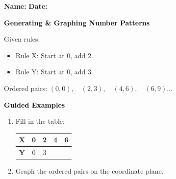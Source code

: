 \documentclass[12pt, letterpaper, fleqn]{article}
\newcommand{\blank}{\underline{\hspace{2.2cm}}}
\begin{document}
\textbf{Name:} \underline{\hspace{5cm}}
\hfill
\textbf{Date:} \underline{\hspace{3cm}}\\

\begin{tcolorbox}[colback=customteal!20]
    \large\textcolor{black}{\textbf{Generating & Graphing Number Patterns}}
\end{tcolorbox}
\vspace{3mm}
Given rules:
\begin{itemize}
    \item Rule X: Start at 0, add 2.
    \item Rule Y: Start at 0, add 3.
\end{itemize}
Ordered pairs: $(0,0), \quad (2,3), \quad (4,6), \quad (6,9) \dots$
\newpage
\begin{tcolorbox}[colback=customteal!20]
    \large\textcolor{black}{\textbf{Guided Examples}}
\end{tcolorbox}
\begin{enumerate}[itemsep=3.5cm, leftmargin=0.6cm]
\item Fill in the table:
\\
\begin{tabular}{|c|c|c|c|c|}
\hline
\textbf{X} & 0 & 2 & 4 & 6 \\ \hline
\textbf{Y} & 0 & 3 & \blank & \blank \\ \hline
\end{tabular}
\item Graph the ordered pairs on the coordinate plane.
\end{enumerate}
\end{document}
